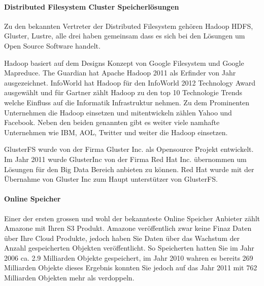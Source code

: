 \paragraph*{Distributed Filesystem Cluster Speicherlösungen}
Zu den bekannten Vertreter der Distributed Filesystem gehören Hadoop HDFS, Gluster, Lustre, alle drei haben gemeinsam dass es sich bei den Lösungen um Open Source Software handelt.

Hadoop basiert auf dem Designs Konzept von Google Filesystem und Google Mapreduce. The Guardian hat Apache Hadoop 2011 als Erfinder von Jahr ausgezeichnet. InfoWorld hat Hadoop für den InfoWorld 2012 Technology Award ausgewählt und für Gartner zählt Hadoop zu den top 10 Technologie Trends welche Einfluss auf die Informatik Infrastruktur nehmen. 
Zu dem Prominenten Unternehmen die Hadoop einsetzen und mitentwickeln zählen Yahoo und Facebook. Neben den beiden genannten gibt es weiter viele namhafte Unternehmen wie IBM, AOL, Twitter und weiter die Hadoop einsetzen. \cite{Guardian}\cite{Wayner2012}\cite{Casonato2012}\cite{Hadoop2012}

GlusterFS wurde von der Firma Gluster Inc. als Opensource Projekt entwickelt. Im Jahr 2011 wurde GlusterInc von der Firma Red Hat Inc. übernommen um Lösungen für den Big Data Bereich anbieten zu können. Red Hat wurde mit der Übernahme von Gluster Inc zum Haupt unterstützer von GlusterFS.

\paragraph*{Online Speicher}
Einer der ersten grossen und wohl der bekannteste Online Speicher Anbieter zählt Amazone mit Ihren S3 Produkt. Amazone veröffentlich zwar keine Finaz Daten über Ihre Cloud Produkte, jedoch haben Sie Daten über das Wachstum der Anzahl gespeicherten Objekten veröffentlicht. So Speicherten hatten Sie im Jahr 2006 ca. 2.9 Milliarden Objekte gespeichert, im Jahr 2010 wahren es bereits 269 Milliarden Objekte dieses Ergebnis konnten Sie jedoch auf das Jahr 2011 mit 762 Milliarden Objekten mehr als verdoppeln. \cite{Barr2012}

